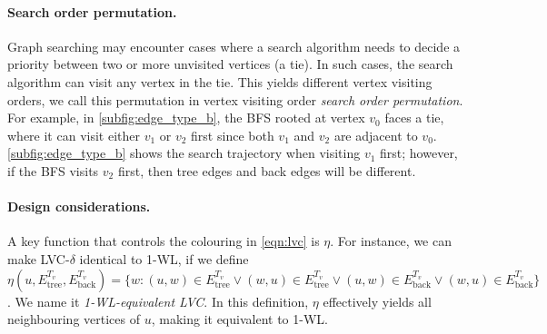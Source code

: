

\paragraph{Search order permutation.}
Graph searching may encounter cases where a search algorithm needs to decide a priority between two or more unvisited vertices (a tie). In such cases, the search algorithm can visit any vertex in the tie. This yields different vertex visiting orders, we call this permutation in vertex visiting order \textit{search order permutation}. 
For example, in \cref{subfig:edge_type_b}, the BFS rooted at vertex $v_0$ faces a tie, where it can visit either $v_1$ or $v_2$ first since both $v_1$ and $v_2$ are adjacent to $v_0$. \cref{subfig:edge_type_b} shows the search trajectory when visiting $v_1$ first; however, if the BFS visits $v_2$ first, then tree edges and back edges will be different. 

\paragraph{Design considerations.}
A key function that controls the colouring in \autoref{eqn:lvc} is $\eta$. For instance, we can make LVC-$\delta$ identical to 1-WL, if we define $\eta(u, E_{\text{tree}}^{T_v}, E_{\text{back}}^{T_v}) = \{w:(u,w) \in E_{\text{tree}}^{T_v}\vee (w,u) \in E_{\text{tree}}^{T_v}\vee (u,w) \in E_{\text{back}}^{T_v} \vee (w,u) \in E_{\text{back}}^{T_v}\}$. We name it \emph{1-WL-equivalent LVC}. In this definition, $\eta$ effectively yields all neighbouring vertices of $u$, making it equivalent to 1-WL. 

